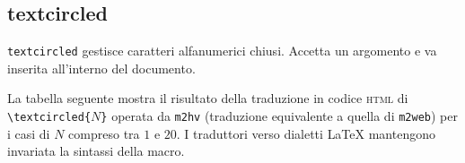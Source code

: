\subsection{textcircled}
\label{ref-12.1.2}

\verb"textcircled" gestisce caratteri alfanumerici chiusi. 
Accetta un argomento e va inserita all'interno del documento. 

La tabella seguente mostra il risultato della traduzione in codice \textsc{html} di \verb"\textcircled{"$N$\verb"}"\index{\bs{}} operata da \verb"m2hv" (traduzione equivalente a quella di \verb"m2web") per i casi di $N$ compreso tra $1$ e $20$. I traduttori verso dialetti {\LaTeX} mantengono invariata la sintassi della macro.


